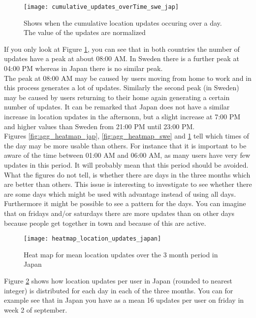 \begin{figure}[H]
    \hspace*{-1.8cm}
    \centering
    \texttt{[image: cumulative\_updates\_overTime\_swe\_jap]}
    \caption{Shows when the cumulative location updates occuring over a day. The value of the updates are normalized}
    \label{fig:cumu_loc_time_jap_swe}
\end{figure}

If you only look at Figure \ref{fig:cumu_loc_time_jap_swe}, you can see that in both countries the number of updates have a peak at about 08:00 AM. In Sweden there is a further peak at 04:00 PM whereas in Japan there is no similar peak. \\
The peak at 08:00 AM may be caused by users moving from home to work and in this process generates a lot of updates. Similarly the second peak (in Sweden) may be caused by users returning to their home again generating a certain number of updates. It can be remarked that Japan does not have a similar increase in location updates in the afternonn, but a slight increase at 7:00 PM and higher values than Sweden from 21:00 PM until 23:00 PM. \\

Figures \ref{fig:agg_heatmap_jap}, \ref{fig:agg_heatmap_swe} and \ref{fig:cumu_loc_time_jap_swe} tell which times of the day may be more usable than others. For instance that it is important to be aware of the time between 01:00 AM and 06:00 AM, as many users have very few updates in this period. It will probably mean that this period should be avoided. 
What the figures do not tell, is whether there are days in the three months which are better than others. This issue is interesting to investigate to see whether there are some days which might be used with advantage instead of using all days. Furthermore it might be possible to see a pattern for the days. You can imagine that on fridays and/or saturdays there are more updates than on other days because people get together in town and because of this are active.  


\begin{figure}[H]
    \hspace*{-1.5cm}
    \centering
    \texttt{[image: heatmap\_location\_updates\_japan]}
    \caption{Heat map for mean location updates over the 3 month period in Japan}
    \label{fig:heatmap_jap}
\end{figure}

Figure \ref{fig:heatmap_jap} shows how location updates per user in Japan (rounded to nearest integer) is distributed for each day in each of the three months. You can for example see that in Japan you have as a mean 16 updates per user on friday in week 2 of september.  

